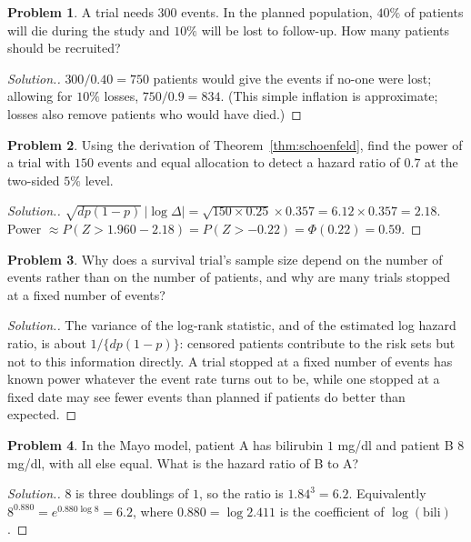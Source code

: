 \documentclass[11pt,a4paper]{article}
\numberwithin{equation}{section}
\theoremstyle{definition}
\newtheorem{problemx}{Problem}[subsection]
\newenvironment{problem}{\begin{problemx}}{\end{problemx}}
\newenvironment{solution}
  {\renewcommand{\qedsymbol}{}\begin{proof}[\textit{Solution}.]}
  {\end{proof}}
\begin{document}
\begin{problem}
A trial needs $300$ events. In the planned population, $40\%$ of patients will die during the study and $10\%$ will be lost to follow-up. How many patients should be recruited?
\end{problem}

\begin{solution}
$300/0.40 = 750$ patients would give the events if no-one were lost; allowing for $10\%$ losses, $750/0.9 = 834$. (This simple inflation is approximate; losses also remove patients who would have died.)
\end{solution}

\begin{problem}
Using the derivation of Theorem~\ref{thm:schoenfeld}, find the power of a trial with $150$ events and equal allocation to detect a hazard ratio of $0.7$ at the two-sided $5\%$ level.
\end{problem}

\begin{solution}
$\sqrt{dp(1 - p)}\,|\log\Delta| = \sqrt{150 \times 0.25} \times 0.357 = 6.12 \times 0.357 = 2.18$. Power $\approx P(Z > 1.960 - 2.18) = P(Z > -0.22) = \Phi(0.22) = 0.59$.
\end{solution}

\begin{problem}
Why does a survival trial's sample size depend on the number of events rather than on the number of patients, and why are many trials stopped at a fixed number of events?
\end{problem}

\begin{solution}
The variance of the log-rank statistic, and of the estimated log hazard ratio, is about $1/\{dp(1 - p)\}$: censored patients contribute to the risk sets but not to this information directly. A trial stopped at a fixed number of events has known power whatever the event rate turns out to be, while one stopped at a fixed date may see fewer events than planned if patients do better than expected.
\end{solution}

\begin{problem}
In the Mayo model, patient A has bilirubin $1$ mg/dl and patient B $8$ mg/dl, with all else equal. What is the hazard ratio of B to A?
\end{problem}

\begin{solution}
$8$ is three doublings of $1$, so the ratio is $1.84^3 = 6.2$. Equivalently $8^{0.880} = e^{0.880\log 8} = 6.2$, where $0.880 = \log 2.411$ is the coefficient of $\log(\text{bili})$.
\end{solution}
\end{document}
